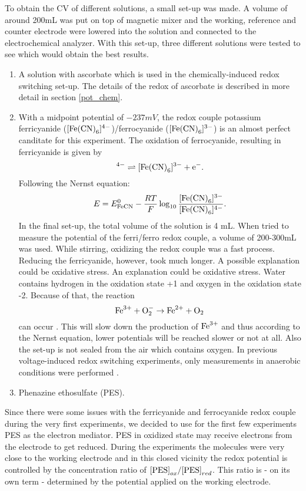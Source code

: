 \documentclass[twoside,single]{lion-msc}
\begin{document}
To obtain the CV of different solutions, a small set-up was made. A volume of around 200mL was put on top of magnetic mixer and the working, reference and counter electrode were lowered into the solution and connected to the electrochemical analyzer. With this set-up, three different solutions were tested to see which would obtain the best results. 
\begin{enumerate}
\item A solution with ascorbate which is used in the chemically-induced redox switching set-up. The details of the redox of ascorbate is described in more detail in section \ref{pot_chem}.
\item With a midpoint potential of $-237 mV$, the redox couple potassium ferricyanide ($[\textup{Fe(CN)}_{6}]^{4-}$)/ferrocyanide ($[\textup{Fe(CN)}_{6}]^{3-}$) is an almost perfect canditate for this experiment. The oxidation of ferrocyanide, resulting in ferricyanide is given by
\begin{equation}
[\textup{Fe(CN)}_{6}]^{4-}\rightleftharpoons[\textup{Fe(CN)}_{6}]^{3-} + \textup{e}^{-}.
\end{equation}
Following the Nernst equation:
\begin{equation}
E = E^{0}_{\textup{FeCN}} - \frac{RT}{F} \log_{10} \frac{[\textup{Fe(CN)}_{6}]^{3-}}{[\textup{Fe(CN)}_{6}]^{4-}}.
\end{equation}
In the final set-up, the total volume of the solution is 4 mL. When tried to measure the potential of the ferri/ferro redox couple, a volume of 200-300mL was used. While stirring, oxidizing the redox couple was a fast process. Reducing the ferricyanide, however, took much longer. A possible explanation could be oxidative stress. An explanation could be oxidative stress. Water contains hydrogen in the oxidation state +1 and oxygen in the oxidation state -2. Because of that, the reaction
$$\textup{Fe}^{3+}+\textup{O}_{2}^{-}\rightarrow\textup{Fe}^{2+}+\textup{O}_{2} $$
can occur \cite{Grady1991}. This will slow down the production of $\textup{Fe}^{3+}$ and thus according to the Nernst equation, lower potentials will be reached slower or not at all. Also the set-up is not sealed from the air which contains oxygen. In previous voltage-induced redox switching experiments, only measurements in anaerobic conditions were performed \cite{Akkilic2015}. 
\item Phenazine ethosulfate (PES).
\end{enumerate}
Since there were some issues with the ferricyanide and ferrocyanide redox couple during the very first experiments, we decided to use for the first few experiments PES as the electron mediator. PES in oxidized state may receive electrons from the electrode to get reduced. During the experiments the molecules were very close to the working electrode and in this closed vicinity the redox potential is controlled by the concentration ratio of $\textup{[PES]}_{ox}/\textup{[PES]}_{red}$. This ratio is - on its own term - determined by the potential applied on the working electrode.
\end{document}
